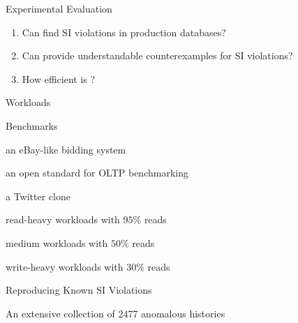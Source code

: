 
\begin{frame}{Experimental Evaluation}
	\begin{center}
		\begin{enumerate}[(1)]
			\setlength{\itemsep}{15pt}
			\item {}
			  Can \polysi{} find SI violations in production databases?
			\item {}
			  Can \polysi{} provide understandable counterexamples for SI violations?
			\item {}
			  How efficient is \polysi?
		\end{enumerate}

	\end{center}
\end{frame}

\begin{frame}{Workloads}
	\begin{center}
		{}
	\end{center}
\end{frame}

\begin{frame}{Benchmarks}
	\begin{center}
		\begin{description}[GeneralRW:]
			\setlength{\itemsep}{10pt}
			\item[RuBis:] an eBay-like bidding system
			\item[TPC-C:] an open standard for OLTP benchmarking
			\item[C-Twitter:] a Twitter clone
			\vspace{10pt}
			\item[GeneralRH:] read-heavy workloads with $95\%$ reads
			\item[GeneralRW:] medium workloads with $50\%$ reads
			\item[GeneralWH:] write-heavy workloads with $30\%$ reads
		\end{description}
	\end{center}
\end{frame}

\begin{frame}{Reproducing Known SI Violations}
	\begin{center}
		{}
		\vspace{0.80cm}

		An extensive collection of 2477 anomalous histories \\[2pt]
	\end{center}
\end{frame}

